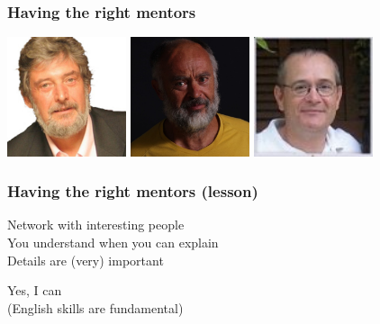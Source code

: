 \documentclass[17pt,aspectratio=169,hyperref=pdfusetitle]{beamer}
\begin{document}
\begin{frame}[fragile]
  \frametitle{Having the right mentors}

  \begin{center}
  \includegraphics[height=3.5cm]{figs/foto-aalvarez}
  \includegraphics[height=3.5cm]{figs/foto-jseoane}
  \includegraphics[height=3.5cm]{figs/foto-sarevalo}
  \end{center}  
  
\end{frame}

\begin{frame}[fragile]
  \frametitle{Having the right mentors (lesson)}

  Network with interesting people \\
  You understand when you can explain \\
  Details are (very) important \\

  \begin{center}
    Yes, I can \\
    (English skills are fundamental) \\
  \end{center}
\end{frame}
\end{document}
